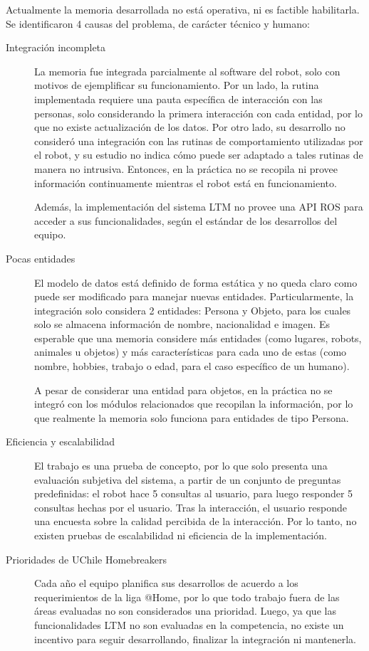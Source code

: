 Actualmente la memoria desarrollada no está operativa, ni es factible habilitarla. Se identificaron 4 causas del problema, de carácter técnico y humano:
\begin{description}
\item[Integración incompleta]
La memoria fue integrada parcialmente al software del robot, solo con motivos de ejemplificar su funcionamiento. Por un lado, la rutina implementada requiere una pauta específica de interacción con las personas, solo considerando la primera interacción con cada entidad, por lo que no existe actualización de los datos. Por otro lado, su desarrollo no consideró una integración con las rutinas de comportamiento utilizadas por el robot, y su estudio no indica cómo puede ser adaptado a tales rutinas de manera no intrusiva. Entonces, en la práctica no se recopila ni provee información continuamente mientras el robot está en funcionamiento.

Además, la implementación del sistema LTM no provee una API ROS para acceder a sus funcionalidades, según el estándar de los desarrollos del equipo. 

\item[Pocas entidades]
El modelo de datos está definido de forma estática y no queda claro como puede ser modificado para manejar nuevas entidades. Particularmente, la integración solo considera 2 entidades: Persona y Objeto, para los cuales solo se almacena información de nombre, nacionalidad e imagen. Es esperable que una memoria considere más entidades (como lugares, robots, animales u objetos) y más características para cada uno de estas (como nombre, hobbies, trabajo o edad, para el caso específico de un humano). 

A pesar de considerar una entidad para objetos, en la práctica no se integró con los módulos relacionados que recopilan la información, por lo que realmente la memoria solo funciona para entidades de tipo Persona.

\item[Eficiencia y escalabilidad]
El trabajo es una prueba de concepto, por lo que solo presenta una evaluación subjetiva del sistema, a partir de un conjunto de preguntas predefinidas: el robot hace 5 consultas al usuario, para luego responder 5 consultas hechas por el usuario. Tras la interacción, el usuario responde una encuesta sobre la calidad percibida de la interacción. Por lo tanto, no existen pruebas de escalabilidad ni eficiencia de la implementación.

\item[Prioridades de UChile Homebreakers] Cada año el equipo planifica sus desarrollos de acuerdo a los requerimientos de la liga @Home, por lo que todo trabajo fuera de las áreas evaluadas no son considerados una prioridad. Luego, ya que las funcionalidades LTM no son evaluadas en la competencia, no existe un incentivo para seguir desarrollando, finalizar la integración ni mantenerla.
\end{description}

